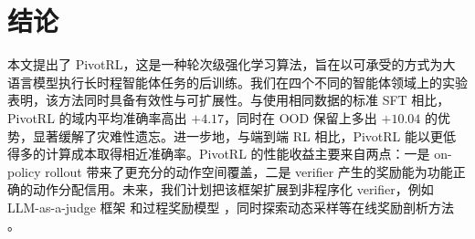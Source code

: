 \section{结论}
\label{sec:conclusion}

本文提出了 PivotRL，这是一种轮次级强化学习算法，旨在以可承受的方式为大语言模型执行长时程智能体任务的后训练。我们在四个不同的智能体领域上的实验表明，该方法同时具备有效性与可扩展性。与使用相同数据的标准 SFT 相比，PivotRL 的域内平均准确率高出 $+4.17$，同时在 OOD 保留上多出 $+10.04$ 的优势，显著缓解了灾难性遗忘。进一步地，与端到端 RL 相比，PivotRL 能以更低得多的计算成本取得相近准确率。PivotRL 的性能收益主要来自两点：一是 on-policy rollout 带来了更充分的动作空间覆盖，二是 verifier 产生的奖励能为功能正确的动作分配信用。未来，我们计划把该框架扩展到非程序化 verifier，例如 LLM-as-a-judge 框架 \citep{zheng2023judgingllmasajudgemtbenchchatbot} 和过程奖励模型 \citep{lightman2023letsverifystepstep}，同时探索动态采样等在线奖励剖析方法 \citep{yu2025dapoopensourcellmreinforcement}。

